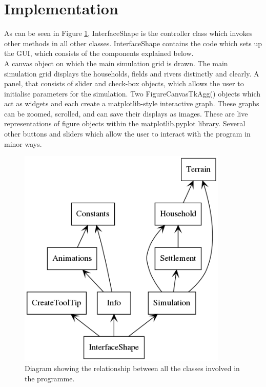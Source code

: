 \documentclass[12pt]{article}
\begin{document}
	\section{Implementation}
		As can be seen in Figure \ref{fig:Packages}, InterfaceShape is the controller class which invokes other methods in all other classes. InterfaceShape contains the code which sets up the GUI, which consists of the components explained below.\\		
		A canvas object on which the main simulation grid is drawn. The main simulation grid displays the households, fields and rivers distinctly and clearly. A panel, that consists of slider and check-box objects, which allows the user to initialise parameters for the simulation. Two FigureCanvasTkAgg() objects which act as widgets and each create a matplotlib-style interactive graph. These graphs can be zoomed, scrolled, and can save their displays as images. These are live representations of figure objects within the matplotlib.pyplot library. Several other buttons and sliders which allow the user to interact with the program in minor ways.\\
		
		\begin{figure}[!htb]
			\includegraphics[width=10cm]{packages}
			\caption{Diagram showing the relationship between all the classes involved in the programme.}
			\label{fig:Packages}
		\end{figure}
		
\end{document}
